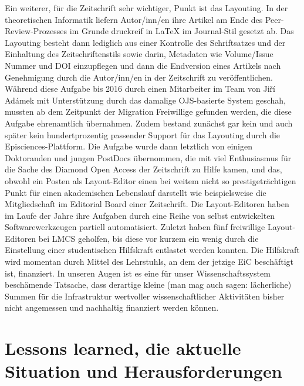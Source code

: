 \documentclass[a4paper,
fontsize=11pt,
oneside,
numbers=noperiodatend,
parskip=half-,
bibliography=totoc,
final
]{scrartcl}
\begin{document}
Ein weiterer, für die Zeitschrift sehr wichtiger, Punkt ist das
Layouting. In der theoretischen Informatik liefern Autor/inn/en ihre
Artikel am Ende des Peer-Review-Prozesses im Grunde druckreif in LaTeX
im Journal-Stil gesetzt ab. Das Layouting besteht dann lediglich aus
einer Kontrolle des Schriftsatzes und der Einhaltung des
Zeitschriftenstils sowie darin, Metadaten wie Volume/Issue Nummer und
DOI einzupflegen und dann die Endversion eines Artikels nach Genehmigung
durch die Autor/inn/en in der Zeitschrift zu veröffentlichen. Während
diese Aufgabe bis 2016 durch einen Mitarbeiter im Team von Jiří Adámek
mit Unterstützung durch das damalige OJS-basierte System geschah,
mussten ab dem Zeitpunkt der Migration Freiwillige gefunden werden, die
diese Aufgabe ehrenamtlich übernahmen. Zudem bestand zunächst gar kein
und auch später kein hundertprozentig passender Support für das
Layouting durch die Episciences-Plattform. Die Aufgabe wurde dann
letztlich von einigen Doktoranden und jungen PostDocs übernommen, die
mit viel Enthusiasmus für die Sache des Diamond Open Access der
Zeitschrift zu Hilfe kamen, und das, obwohl ein Posten als Layout-Editor
einen bei weitem nicht so prestigeträchtigen Punkt für einen
akademischen Lebenslauf darstellt wie beispielsweise die Mitgliedschaft
im Editorial Board einer Zeitschrift. Die Layout-Editoren haben im Laufe
der Jahre ihre Aufgaben durch eine Reihe von selbst entwickelten
Softwarewerkzeugen partiell automatisiert. Zuletzt haben fünf
freiwillige Layout-Editoren bei LMCS geholfen, bis diese vor kurzem ein
wenig durch die Einstellung einer studentischen Hilfskraft entlastet
werden konnten. Die Hilfskraft wird momentan durch Mittel des
Lehrstuhls, an dem der jetzige EiC beschäftigt ist, finanziert. In
unseren Augen ist es eine für unser Wissenschaftssystem beschämende
Tatsache, dass derartige kleine (man mag auch sagen: lächerliche) Summen
für die Infrastruktur wertvoller wissenschaftlicher Aktivitäten bisher
nicht angemessen und nachhaltig finanziert werden können.

\hypertarget{lessons-learned-die-aktuelle-situation-und-herausforderungen}{%
\section{Lessons learned, die aktuelle Situation und
Herausforderungen}\label{lessons-learned-die-aktuelle-situation-und-herausforderungen}}
\end{document}
